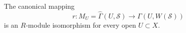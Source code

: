 The canonical mapping
$$
r : M_U = \hat{\Gamma}(U, \mathcal{S}) \to \Gamma(U, W(\mathcal{S}))
$$
is an $R$-module isomorphism for every open $U \subset X$.
